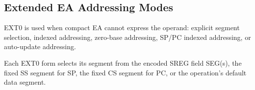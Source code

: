 \clearpage
\subsection{Extended EA Addressing Modes}\label{section:extended-ea-addressing}
EXT0 is used when compact EA cannot express the operand: explicit segment selection, indexed addressing, zero-base
addressing, SP/PC indexed addressing, or auto-update addressing.

Each EXT0 form selects its segment from the encoded SREG field SEG(s), the fixed SS segment for SP, the fixed CS
segment for PC, or the operation's default data segment.


